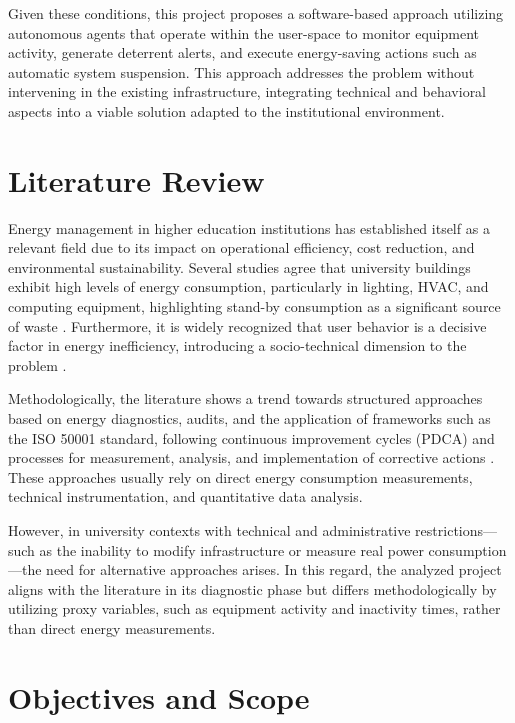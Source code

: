 \documentclass[12pt,a4paper]{article}
\begin{document}
Given these conditions, this project proposes a software-based approach utilizing autonomous agents that operate within the user-space to monitor equipment activity, generate deterrent alerts, and execute energy-saving actions such as automatic system suspension. This approach addresses the problem without intervening in the existing infrastructure, integrating technical and behavioral aspects into a viable solution adapted to the institutional environment.

\section{Literature Review}
Energy management in higher education institutions has established itself as a relevant field due to its impact on operational efficiency, cost reduction, and environmental sustainability. Several studies agree that university buildings exhibit high levels of energy consumption, particularly in lighting, HVAC, and computing equipment, highlighting stand-by consumption as a significant source of waste \cite{b1, b4}. Furthermore, it is widely recognized that user behavior is a decisive factor in energy inefficiency, introducing a socio-technical dimension to the problem \cite{b3}.

Methodologically, the literature shows a trend towards structured approaches based on energy diagnostics, audits, and the application of frameworks such as the ISO 50001 standard, following continuous improvement cycles (PDCA) and processes for measurement, analysis, and implementation of corrective actions \cite{b2, b4}. These approaches usually rely on direct energy consumption measurements, technical instrumentation, and quantitative data analysis.

However, in university contexts with technical and administrative restrictions—such as the inability to modify infrastructure or measure real power consumption—the need for alternative approaches arises. In this regard, the analyzed project aligns with the literature in its diagnostic phase but differs methodologically by utilizing proxy variables, such as equipment activity and inactivity times, rather than direct energy measurements.

\section{Objectives and Scope}
\end{document}
